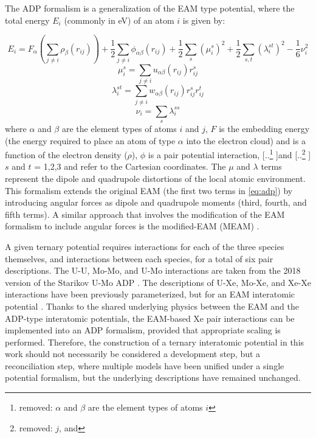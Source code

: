 \documentclass[review]{elsarticle}
\providecommand{\DIFaddtex}[1]{{\protect\color{blue} \sf #1}} %
\providecommand{\DIFdeltex}[1]{{\protect\color{red} [..\footnote{removed: #1} ]}} %
\providecommand{\DIFaddbegin}{} %
\providecommand{\DIFaddend}{} %
\providecommand{\DIFdelbegin}{} %
\providecommand{\DIFdelend}{} %
\providecommand{\DIFadd}[1]{\texorpdfstring{\DIFaddtex{#1}}{#1}} %
\providecommand{\DIFdel}[1]{\texorpdfstring{\DIFdeltex{#1}}{}} %
\newcommand{\DIFscaledelfig}{0.5}
\newlength{\DIFdelgraphicswidth} %
\newlength{\DIFdelgraphicsheight} %
\newcommand{\DIFaddincludegraphics}[2][]{{\color{blue}\fbox{\DIFOincludegraphics[#1]{#2}}}} %
\newcommand{\DIFdelincludegraphics}[2][]{%
\sbox{\DIFdelgraphicsbox}{\DIFOincludegraphics[#1]{#2}}%
\settoboxwidth{\DIFdelgraphicswidth}{\DIFdelgraphicsbox} %
\settoboxtotalheight{\DIFdelgraphicsheight}{\DIFdelgraphicsbox} %
\scalebox{\DIFscaledelfig}{%
\parbox[b]{\DIFdelgraphicswidth}{\usebox{\DIFdelgraphicsbox}\\[-\baselineskip] \rule{\DIFdelgraphicswidth}{0em}}\llap{\resizebox{\DIFdelgraphicswidth}{\DIFdelgraphicsheight}{%
\setlength{\unitlength}{\DIFdelgraphicswidth}%
\begin{picture}(1,1)%
\thicklines\linethickness{2pt} %
{\color[rgb]{1,0,0}\put(0,0){\framebox(1,1){}}}%
{\color[rgb]{1,0,0}\put(0,0){\line( 1,1){1}}}%
{\color[rgb]{1,0,0}\put(0,1){\line(1,-1){1}}}%
\end{picture}%
}\hspace*{3pt}}} %
} %
\DeclareRobustCommand{\DIFaddbegin}{\DIFOaddbegin \let\includegraphics\DIFaddincludegraphics} %
\DeclareRobustCommand{\DIFaddend}{\DIFOaddend \let\includegraphics\DIFOincludegraphics} %
\DeclareRobustCommand{\DIFdelbegin}{\DIFOdelbegin \let\includegraphics\DIFdelincludegraphics} %
\DeclareRobustCommand{\DIFdelend}{\DIFOaddend \let\includegraphics\DIFOincludegraphics} %
\begin{document}
The ADP \cite{mishin2005} formalism is a generalization of the EAM type potential, where the total energy $E_i$ \DIFaddbegin \DIFadd{(commonly in eV) }\DIFaddend of an atom $i$ is given by:

\begin{equation}\label{eq:adp}
E_i = F_{\alpha} \left( \sum\limits_{j\neq i} \rho_{\beta}(r_{ij}) \right) + \frac{1}{2}\sum\limits_{j \neq i} \phi_{\alpha \beta}(r_{ij}) + \frac{1}{2}\sum\limits_{s}(\mu_i^s)^2 + \frac{1}{2}\sum\limits_{s,t}(\lambda_i^{st})^2 - \frac{1}{6}\nu_i^2 
\end{equation}
\begin{equation}
\mu_i^s = \sum\limits_{j \neq i} u_{\alpha \beta}(r_{ij})r_{ij}^s
\end{equation}
\begin{equation}
\lambda_i^{st} = \sum\limits_{j \neq i} w_{\alpha \beta}(r_{ij})r_{ij}^s r_{ij}^t
\end{equation}
\begin{equation}
\nu_i = \sum\limits_{s} \lambda_i^{ss} 
\end{equation}
\noindent where \DIFaddbegin \DIFadd{$\alpha$ and $\beta$ are the element types of atoms $i$ and $j$, }\DIFaddend $F$ is the embedding energy \DIFaddbegin \DIFadd{(the energy required to place an atom of type $\alpha$ into the electron cloud) }\DIFaddend and is a function of the electron density ($\rho$), $\phi$ is a pair potential interaction, \DIFdelbegin \DIFdel{$\alpha$ and $\beta$ are the element types of atoms $i$ }\DIFdelend and \DIFdelbegin \DIFdel{$j$, and }\DIFdelend $s$ and $t$ = 1,2,3 and refer to the Cartesian coordinates. The $\mu$ and $\lambda$ terms represent the dipole and quadrupole distortions of the local atomic environment. This formalism extends the original EAM (the first two terms in \cref{eq:adp}) by introducing angular forces as dipole and quadrupole moments (third, fourth, and fifth terms). A similar approach that involves the modification of the EAM formalism to include angular forces is the modified-EAM (MEAM) \cite{baskes1989,baskes1992}. 

A given ternary potential requires interactions for each of the three species themselves, and interactions between each species, for a total of six pair descriptions. The U-U, Mo-Mo, and U-Mo interactions are taken from the 2018 version of the Starikov U-Mo ADP \cite{starikov2018}. The descriptions of U-Xe, Mo-Xe, and Xe-Xe interactions have been previously parameterized, but for an EAM interatomic potential \cite{smirnovaUMoXe}. Thanks to the shared underlying physics between the EAM and the ADP-type interatomic potentials, the EAM-based Xe pair interactions can be implemented into an ADP formalism, provided that appropriate scaling is performed. Therefore, the construction of a ternary interatomic potential in this work should not necessarily be considered a development step, but a reconciliation step, where multiple models have been unified under a single potential formalism, but the underlying descriptions have remained unchanged. 
\end{document}
